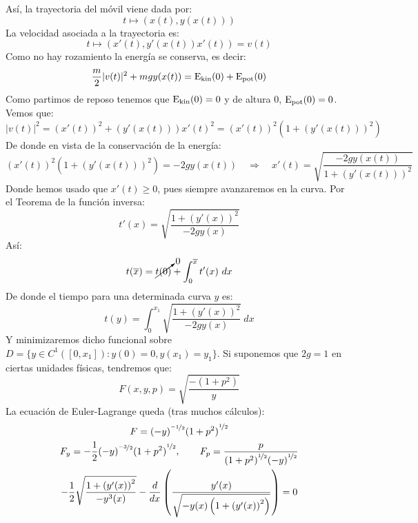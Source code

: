 \noindent
Así, la trayectoria del móvil viene dada por:
\begin{equation*}
    t\longmapsto (x(t), y(x(t)))
\end{equation*}
La velocidad asociada a la trayectoria es:
\begin{equation*}
    t\longmapsto (x'(t), y'(x(t))x'(t)) = v(t)
\end{equation*}
Como no hay rozamiento la energía se conserva, es decir:
\begin{equation*}
    \frac{m}{2}|v(t)|^2 + mgy(x(t)) = \operatorname{\text{E}_{\text{kin}}}(0) + \operatorname{\text{E}_{\text{pot}}}(0)
\end{equation*}
Como partimos de reposo tenemos que $\operatorname{\text{E}_{\text{kin}}}(0) = 0$ y de altura $0$, $\operatorname{\text{E}_{\text{pot}}}(0) = 0$. Vemos que:
\begin{equation*}
    |v(t)|^2 = {(x'(t))}^{2} + {(y'(x(t)))x'(t)}^{2} = {(x'(t))}^{2}(1+{(y'(x(t)))}^{2})
\end{equation*}
De donde en vista de la conservación de la energía:
\begin{equation*}
    {(x'(t))}^{2}(1+{(y'(x(t)))}^{2}) = -2gy(x(t)) \quad\Longrightarrow\quad x'(t) = \sqrt{\frac{-2gy(x(t))}{1+{(y'(x(t)))}^{2}}}
\end{equation*}
Donde hemos usado que $x'(t)\geq 0$, pues siempre avanzaremos en la curva. Por el Teorema de la función inversa:
\begin{equation*}
    t'(x) = \sqrt{\frac{1+{(y'(x))}^{2}}{-2gy(x)}}
\end{equation*}
Así:
\begin{equation*}
    t(\overline{x}) = \cancelto{0}{t(0)} + \int_{0}^{\overline{x}} t'(x)~dx 
\end{equation*}
De donde el tiempo para una determinada curva $y$ es:
\begin{equation*}
    t(y) = \int_{0}^{x_1} \sqrt{\frac{1+{(y'(x))}^{2}}{-2gy(x)}}~dx 
\end{equation*}
Y minimizaremos dicho funcional sobre $D= \{y\in C^1([0,x_1]) : y(0) = 0, y(x_1) = y_1\}$. Si suponemos que $2g = 1$ en ciertas unidades físicas, tendremos que:
\begin{equation*}
    F(x,y,p) = \sqrt{\frac{-(1+p^2)}{y}}
\end{equation*}
La ecuación de Euler-Lagrange queda (tras muchos cálculos):  
\begin{gather*}
    F = {(-y)}^{\nicefrac{-1}{2}} {(1+p^2)}^{\nicefrac{1}{2}} \\
    F_y = -\frac{1}{2}{(-y)}^{\nicefrac{-3}{2}}{(1+p^2)}^{\nicefrac{1}{2}}, \qquad F_p = \frac{p}{{(1+p^2)}^{\nicefrac{1}{2}}{(-y)}^{\nicefrac{1}{2}}} \\
    -\frac{1}{2}\sqrt{\frac{1+{(y'(x))}^{2}}{-y^3(x)}} - \frac{d}{dx}\left(\frac{y'(x)}{\sqrt{-y(x)\left(1+{(y'(x))}^{2}\right)}}\right) = 0
\end{gather*}
